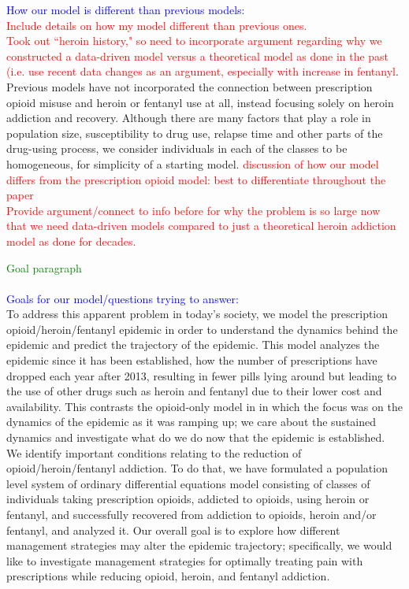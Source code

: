 \documentclass[12pt]{article}
\begin{document}
\textcolor{blue}{How our model is different than previous models:} \\
\textcolor{red}{Include details on how my model different than previous ones.} \\
 \textcolor{red}{Took out ``heroin history," so need to incorporate argument regarding why we constructed a data-driven model versus a theoretical model as done in the past (i.e. use recent data changes as an argument, especially with increase in fentanyl}. Previous models have not incorporated the connection between prescription opioid misuse and heroin or fentanyl use at all, instead focusing solely on heroin addiction and recovery. Although there are many factors that play a role in population size, susceptibility to drug use, relapse time and other parts of the drug-using process, we consider individuals in each of the classes to be homogeneous, for simplicity of a starting model. \textcolor{red}{discussion of how our model differs from the prescription opioid model: best to differentiate throughout the paper} \\
 \textcolor{red}{Provide argument/connect to info before for why the problem is so large now that we need data-driven models compared to just a theoretical heroin addiction model as done for decades.}


\textcolor{green}{Goal paragraph} \\ \\
\textcolor{blue}{Goals for our model/questions trying to answer:} \\
To address this apparent problem in today's society, we model the prescription opioid/heroin/fentanyl epidemic in order to understand the dynamics behind the epidemic and predict the trajectory of the epidemic. This model analyzes the epidemic since it has been established, how the number of prescriptions have dropped each year after 2013, resulting in fewer pills lying around but leading to the use of other drugs such as heroin and fentanyl due to their lower cost and availability. This contrasts the opioid-only model in \cite{Battista} in which the focus was on the dynamics of the epidemic as it was ramping up; we care about the sustained dynamics and investigate what do we do now that the epidemic is established. We identify important conditions relating to the reduction of opioid/heroin/fentanyl addiction. To do that, we have formulated a population level system of ordinary differential equations model consisting of classes of individuals taking prescription opioids, addicted to opioids, using heroin or fentanyl, and successfully recovered from addiction to opioids, heroin and/or fentanyl, and analyzed it. Our overall goal is to explore how different management strategies may alter the epidemic trajectory; specifically, we would like to investigate management strategies for optimally treating pain with prescriptions while reducing opioid, heroin, and fentanyl addiction.
\end{document}
